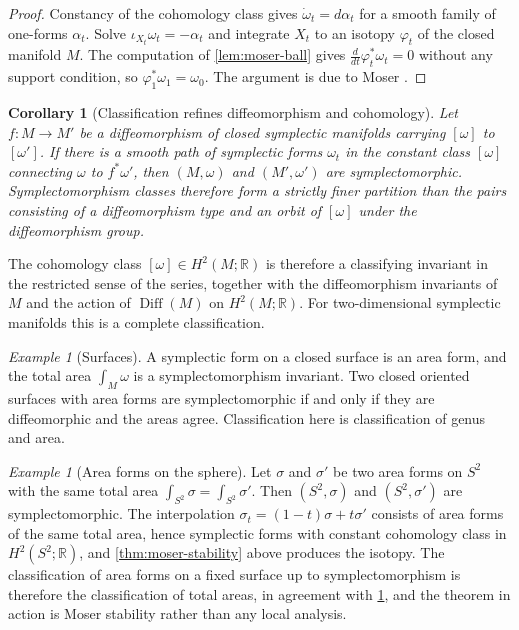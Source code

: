\documentclass[11pt,letterpaper]{article}
\newtheorem{corollary}[theorem]{Corollary}
\theoremstyle{definition}
\theoremstyle{remark}
\newtheorem{example}[theorem]{Example}
\begin{document}
\begin{proof}
Constancy of the cohomology class gives $\dot{\omega}_t = d \alpha_t$ for a smooth family of one-forms $\alpha_t$. Solve $\iota_{X_t} \omega_t = -\alpha_t$ and integrate $X_t$ to an isotopy $\varphi_t$ of the closed manifold $M$. The computation of \cref{lem:moser-ball} gives $\frac{d}{dt} \varphi_t^{*} \omega_t = 0$ without any support condition, so $\varphi_1^{*} \omega_1 = \omega_0$. The argument is due to Moser \cite{moser}.
\end{proof}

\begin{corollary}[Classification refines diffeomorphism and cohomology]
\label{cor:classification-data}
Let $f : M \to M'$ be a diffeomorphism of closed symplectic manifolds carrying $[\omega]$ to $[\omega']$. If there is a smooth path of symplectic forms $\omega_t$ in the constant class $[\omega]$ connecting $\omega$ to $f^{*} \omega'$, then $(M, \omega)$ and $(M', \omega')$ are symplectomorphic. Symplectomorphism classes therefore form a strictly finer partition than the pairs consisting of a diffeomorphism type and an orbit of $[\omega]$ under the diffeomorphism group.
\end{corollary}

The cohomology class $[\omega] \in H^{2}(M; \mathbb{R})$ is therefore a classifying invariant in the restricted sense of the series, together with the diffeomorphism invariants of $M$ and the action of $\operatorname{Diff}(M)$ on $H^{2}(M; \mathbb{R})$. For two-dimensional symplectic manifolds this is a complete classification.

\begin{example}[Surfaces]
\label{ex:surfaces}
A symplectic form on a closed surface is an area form, and the total area $\int_{M} \omega$ is a symplectomorphism invariant. Two closed oriented surfaces with area forms are symplectomorphic if and only if they are diffeomorphic and the areas agree. Classification here is classification of genus and area.
\end{example}

\begin{example}[Area forms on the sphere]
\label{ex:area-sphere}
Let $\sigma$ and $\sigma'$ be two area forms on $S^{2}$ with the same total area $\int_{S^{2}} \sigma = \int_{S^{2}} \sigma'$. Then $(S^{2}, \sigma)$ and $(S^{2}, \sigma')$ are symplectomorphic. The interpolation $\sigma_t = (1 - t) \sigma + t \sigma'$ consists of area forms of the same total area, hence symplectic forms with constant cohomology class in $H^{2}(S^{2}; \mathbb{R})$, and \cref{thm:moser-stability} above produces the isotopy. The classification of area forms on a fixed surface up to symplectomorphism is therefore the classification of total areas, in agreement with \cref{ex:surfaces}, and the theorem in action is Moser stability rather than any local analysis.
\end{example}
\end{document}
